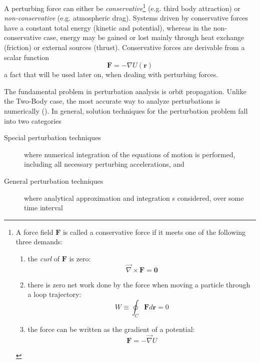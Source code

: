 A perturbing force can either be \emph{conservative}\footnote{
A force field $\bm{F}$ is called a conservative force if it meets one of the 
following three demands:
  \begin{enumerate}
    \item the \emph{curl} of $\bm{F}$ is zero:\begin{equation}\vec{\nabla} \times \bm{F} = \bm{0}\end{equation}
    \item there is zero net work done by the force when moving a particle 
      through a loop trajectory:\begin{equation}W \equiv \oint _C \bm{F}d\bm{r}=0 \end{equation}
    \item the force can be written as the gradient of a potential:\begin{equation}\bm{F}=-\vec{\nabla} U\end{equation}
  \end{enumerate}
} (e.g. third body attraction) or \emph{non-conservative} (e.g. atmospheric drag). 
Systems driven by conservative forces have a constant total energy (kinetic and potential), 
whereas in the non-conservative case, energy may be gained or lost mainly through 
heat exchange (friction) or external sources (thrust). Conservative forces are 
derivable from a scalar function
\begin{equation}
  \bm{F} = -\nabla U(\bm{r})
\end{equation}
a fact that will be used later on, when dealing with perturbing forces.

The fundamental problem in perturbation analysis is orbit propagation. Unlike the 
Two-Body case, the most accurate way to analyze perturbations is numerically (\cite{Vallado2001}).
In general, solution techniques for the perturbation problem fall into two categories 
\begin{description}
  \item[Special perturbation techniques] where numerical integration of the equations 
  of motion is performed, including all necessary perturbing accelerations, and
  \item[General perturbation techniques] where analytical approximation and 
  integration s considered, over some time interval
\end{description}

